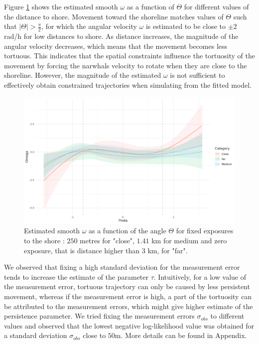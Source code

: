 \documentclass[11pt]{article}
\newcommand {\1}{\mathbb{1}}
\theoremstyle{definition}
\theoremstyle{remark}
\theoremstyle{remark}
\begin{document}
Figure \ref{fig:febaseline3omegaanglenormalq0} shows the estimated smooth $\omega$ as a function of $\Theta$ for different values of the distance to shore. Movement toward the shoreline matches values of $\Theta$ such that $\vert \Theta \vert > \frac{\pi}{2}$, for which the angular velocity $\omega$ is estimated to be close to $\pm 2$ rad/h for low distances to shore. As distance increases, the magnitude of the angular velocity decreases, which means that the movement becomes less tortuous. This indicates that the spatial constraints influence the tortuosity of the movement by forcing the narwhals velocity to rotate when they are close to the shoreline. However, the magnitude of the estimated $\omega$ is not sufficient to effectively obtain constrained trajectories when simulating from the fitted model.
\begin{figure}[H]
	\centering
	\includegraphics[width=0.7\linewidth]{"images/application/baseline/omega_DistanceShore_levels.png"}
	\caption{Estimated smooth $\omega$ as a function of the angle $\Theta$ for fixed exposures to the shore : $250$ metres for "close", $1.41$ km for medium and zero exposure, that is distance higher than $3$ km, for "far".}

	\label{fig:febaseline3omegaanglenormalq0}
\end{figure}


We observed that fixing a high standard deviation for the measurement error tends to increase the estimate of the parameter $\tau$. Intuitively, for a low value of the measurement error, tortuous trajectory can only be caused by less persistent movement, whereas if the measurement error is high, a part of the tortuosity can be attributed to the measurement errors, which might give higher estimate of the persistence parameter. We tried fixing the measurement errors $\sigma_{obs}$ to different values and observed that the lowest negative log-likelihood value was obtained for a standard deviation $\sigma_{obs}$ close to $50$m. More details can be found in Appendix.
\end{document}
